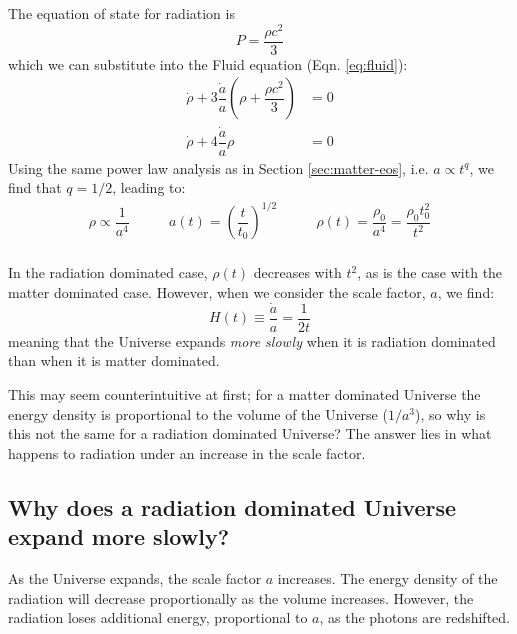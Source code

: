 \documentclass[11pt,a4paper,notoc]{tufte-handout}
\begin{document}
The equation of state for radiation is
\begin{equation}
P = \dfrac{\rho c^2}{3}
\label{eq:rad-eos-1}
\end{equation}
which we can substitute into the Fluid equation
(Eqn. \eqref{eq:fluid}):
\begin{align}
    \dot{\rho} + 3\dfrac{\dot{a}}{a}\left(\rho + \dfrac{\rho c^2}{3}\right) &= 0\\
    \dot{\rho} + 4\dfrac{\dot{a}}{a}\rho &= 0
\label{eq:rad-eos-2}
\end{align}
Using the
same power law analysis as in
Section \ref{sec:matter-eos}, i.e. \(a \propto t^q\), we find that
\(q = 1/2\), leading to:
\begin{equation}
\begin{array}{lcr}
    \rho \propto \dfrac{1}{a^4} & \qquad a(t) = \left(\dfrac{t}{t_0}\right)^{1/2} & \qquad \rho(t) = \dfrac{\rho_0}{a^4} = \dfrac{\rho_0 t_0^2}{t^2}\\
\end{array}
\label{eq:rad-eos-3}    
\end{equation}

In the radiation dominated case, \(\rho(t)\) decreases with \(t^2\), as is
the case with the matter dominated case. However, when we consider the
scale factor, \(a\), we find:
\[H(t) \equiv \dfrac{\dot{a}}{a} = \dfrac{1}{2t}\] meaning that the
Universe expands \emph{more slowly} when it is radiation dominated than when
it is matter dominated.

This may seem counterintuitive at first; for a matter dominated Universe
the energy density is proportional to the volume of the Universe
(\(1/a^3\)), so why is this not the same for a radiation dominated
Universe? The answer lies in what happens to radiation under an increase
in the scale factor.

\hypertarget{sec:slow_expansion_rad}{%
\subsection{Why does a radiation dominated Universe expand more slowly?}\label{sec:slow_expansion_rad}}

As the Universe expands, the scale factor \(a\) increases. The energy
density of the radiation will decrease proportionally as the volume
increases. However, the radiation loses additional energy, proportional
to \(a\), as the photons are redshifted.
\end{document}
